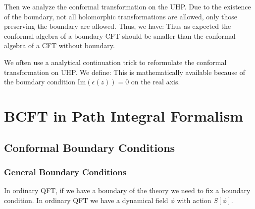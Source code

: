 Then we analyze the conformal transformation on the UHP. Due to the
existence of the boundary, not all holomorphic transformations are
allowed, only those preserving the boundary are allowed. Thus, we have:
Thus as expected the conformal algebra of a boundary CFT should be
smaller than the conformal algebra of a CFT without boundary.

We often use a analytical continuation trick to reformulate the
conformal transformation on UHP. We define:
This is mathematically available because of the boundary condition $
\mathrm{Im}(\epsilon(z))=0 $ on the real axis.

\newpage
\section{BCFT in Path Integral Formalism}

\subsection{Conformal Boundary Conditions}

\subsubsection{General Boundary Conditions}

In ordinary QFT, if we have a boundary of the theory we need to fix a
boundary condition. In ordinary QFT we have a dynamical field $ \phi
$ with action $ S[\phi] $.

